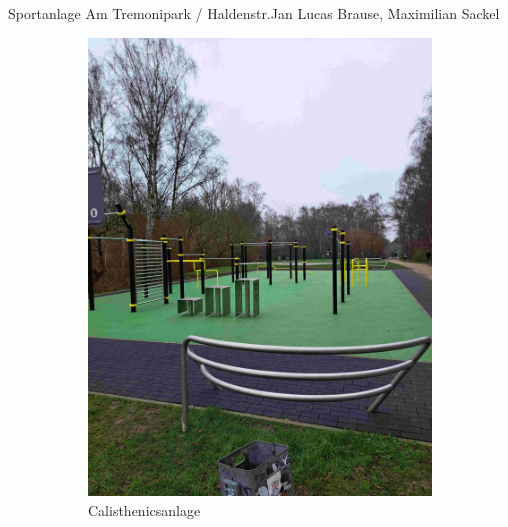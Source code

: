\documentclass{../../templates/amendment}
\begin{document}
\begin{boxed}{Sportanlage Am Tremonipark / Haldenstr.}{Jan Lucas Brause, Maximilian Sackel}
\begin{figure}[htpb]
\begin{subfigure}[t]{0.32\textwidth}
        \end{subfigure}
        \begin{subfigure}[t]{0.32\textwidth}
            \begin{center}
                \includegraphics[width=\linewidth]{pictures/photo3.jpg}
                \caption{Calisthenicsanlage}%
            \end{center}
        \end{subfigure}
        \begin{subfigure}[t]{0.32\textwidth}
            \begin{center}

\end{center}
\end{subfigure}
\end{figure}
\end{boxed}
\end{document}
